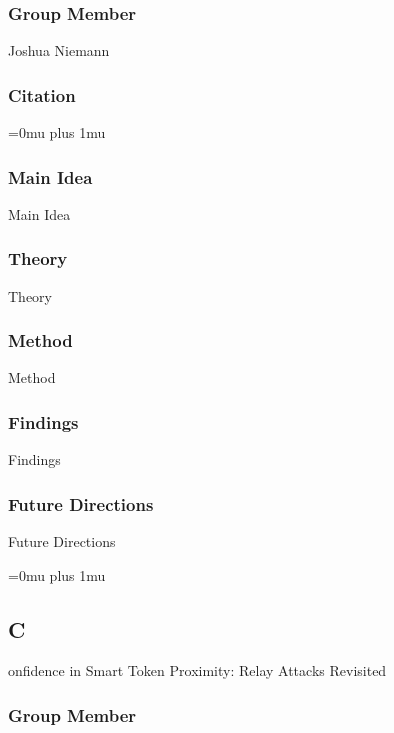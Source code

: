 \subsubsection{Group Member}

\noindent
Joshua Niemann

\noindent
\subsubsection{Citation}

\Urlmuskip=0mu plus 1mu\relax

\subsubsection{Main Idea}

\noindent
Main Idea

\subsubsection{Theory}

\noindent
Theory

\subsubsection{Method}

\noindent
Method

\subsubsection{Findings}

\noindent
Findings

\subsubsection{Future Directions}

\noindent
Future Directions 

\Urlmuskip=0mu plus 1mu\relax

\noindent
\subsection{C}onfidence in {S}mart {T}oken {P}roximity: {R}elay {A}ttacks {R}evisited

\subsubsection{Group Member}

